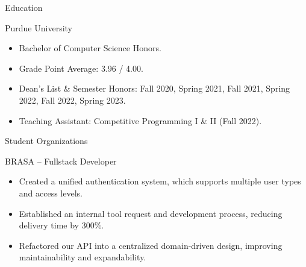 \documentclass[]{article}
\newlength{\tabin}
\newlength{\secsep}
\newcommand{\lineunder}{\vspace*{-8pt} \\ \hspace*{-6pt} \hrulefill \\ \vspace*{-15pt}}
\newenvironment{tabbedsection}[1]{
  \begin{list}{}{
      \setlength{\itemsep}{0pt}
      \setlength{\labelsep}{0pt}
      \setlength{\labelwidth}{0pt}
      \setlength{\leftmargin}{\tabin}
      \setlength{\rightmargin}{\tabin}
      \setlength{\listparindent}{0pt}
      \setlength{\parsep}{0pt}
      \setlength{\parskip}{0pt}
      \setlength{\partopsep}{0pt}
      \setlength{\topsep}{#1}
    }
  \item[]
}{\end{list}}
\newenvironment{resume_section}[1]{
  \filbreak
  \vspace{2\secsep}
  \textsc{\large#1}
  \lineunder
  \begin{tabbedsection}{\secsep}
}{\end{tabbedsection}}
\newenvironment{resume_subsection}[2][]{
  \textbf{#2} \hfill {\footnotesize #1} \hspace{2em}
  \begin{tabbedsection}{0.5\secsep}
}{\end{tabbedsection}}
\newenvironment{subitems}{
  \renewcommand{\labelitemi}{-}
  \begin{itemize}
      \setlength{\labelsep}{1em}
}{\end{itemize}}
\begin{document}

\begin{resume_section}{Education}

	\begin{resume_subsection}{Purdue University}

		\begin{subitems}

			\item Bachelor of Computer Science Honors.

			\item Grade Point Average: 3.96 / 4.00.

			\item Dean's List \& Semester Honors: Fall 2020, Spring 2021, Fall 2021, Spring 2022,
			Fall 2022, Spring 2023.

			\item Teaching Assistant: Competitive Programming I \& II (Fall 2022).

		\end{subitems}

	\end{resume_subsection}

\end{resume_section}


\begin{resume_section}{Student Organizations}

	\begin{resume_subsection}[Remote (2021.08 -- 2022.08)]{BRASA -- Fullstack Developer}

		\begin{subitems}

			\item Created a unified authentication system, which supports multiple user types and
			access levels.

			\item Established an internal tool request and development process, reducing delivery
			time by 300\%.

			\item Refactored our API into a centralized domain-driven design, improving
			maintainability and expandability.

		\end{subitems}

	\end{resume_subsection}

\end{resume_section}
\end{document}
